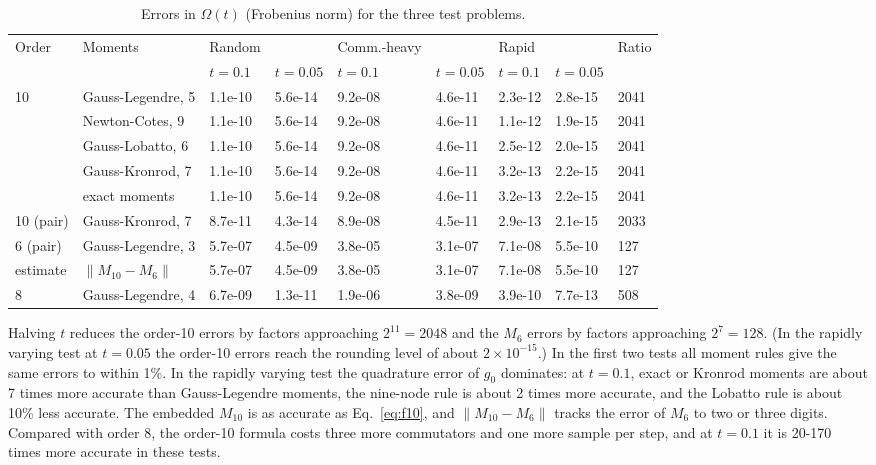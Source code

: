 \documentclass[12pt]{article}
\begin{document}
\begin{table}[H]
\centering\footnotesize\setlength{\tabcolsep}{4pt}
\caption{Errors in $\Omega(t)$ (Frobenius norm) for the three test problems.}\label{tab:results}
\begin{tabular}{lllllllll}
\hline
Order & Moments & Random &  & Comm.-heavy &  & Rapid &  & Ratio \\
 &  & $t=0.1$ & $t=0.05$ & $t=0.1$ & $t=0.05$ & $t=0.1$ & $t=0.05$ &  \\ \hline
10 & Gauss-Legendre, 5 & 1.1e-10 & 5.6e-14 & 9.2e-08 & 4.6e-11 & 2.3e-12 & 2.8e-15 & 2041 \\
 & Newton-Cotes, 9 & 1.1e-10 & 5.6e-14 & 9.2e-08 & 4.6e-11 & 1.1e-12 & 1.9e-15 & 2041 \\
 & Gauss-Lobatto, 6 & 1.1e-10 & 5.6e-14 & 9.2e-08 & 4.6e-11 & 2.5e-12 & 2.0e-15 & 2041 \\
 & Gauss-Kronrod, 7 & 1.1e-10 & 5.6e-14 & 9.2e-08 & 4.6e-11 & 3.2e-13 & 2.2e-15 & 2041 \\
 & exact moments & 1.1e-10 & 5.6e-14 & 9.2e-08 & 4.6e-11 & 3.2e-13 & 2.2e-15 & 2041 \\
10 (pair) & Gauss-Kronrod, 7 & 8.7e-11 & 4.3e-14 & 8.9e-08 & 4.5e-11 & 2.9e-13 & 2.1e-15 & 2033 \\
6 (pair) & Gauss-Legendre, 3 & 5.7e-07 & 4.5e-09 & 3.8e-05 & 3.1e-07 & 7.1e-08 & 5.5e-10 & 127 \\
estimate & $\|M_{10}-M_{6}\|$ & 5.7e-07 & 4.5e-09 & 3.8e-05 & 3.1e-07 & 7.1e-08 & 5.5e-10 & 127 \\
8 & Gauss-Legendre, 4 & 6.7e-09 & 1.3e-11 & 1.9e-06 & 3.8e-09 & 3.9e-10 & 7.7e-13 & 508 \\ \hline
\end{tabular}
\end{table}

Halving $t$ reduces the order-10 errors by factors approaching $2^{11}=2048$ and the $M_6$ errors by factors approaching $2^7=128$. (In the rapidly varying test at $t=0.05$ the order-10 errors reach the rounding level of about $2\times10^{-15}$.) In the first two tests all moment rules give the same errors to within 1\%. In the rapidly varying test the quadrature error of $g_0$ dominates: at $t=0.1$, exact or Kronrod moments are about 7 times more accurate than Gauss-Legendre moments, the nine-node rule is about 2 times more accurate, and the Lobatto rule is about 10\% less accurate. The embedded $M_{10}$ is as accurate as Eq.~\ref{eq:f10}, and $\|M_{10}-M_6\|$ tracks the error of $M_6$ to two or three digits. Compared with order 8, the order-10 formula costs three more commutators and one more sample per step, and at $t=0.1$ it is 20-170 times more accurate in these tests.
\end{document}
